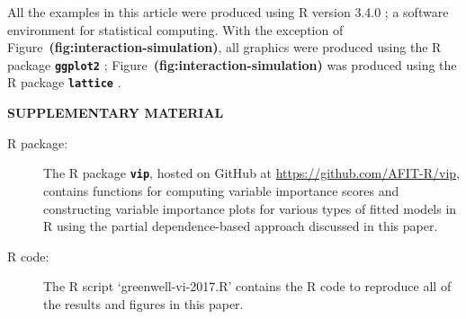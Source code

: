 \documentclass[12pt]{article}
\newcommand{\pkg}[1]{\texorpdfstring%
{{\normalfont\fontseries{b}\selectfont #1}}%
{#1}}
\newcommand{\file}[1]{{`\normalfont\textsf{#1}'}}
\def\pkg#1{\textbf{\texttt{#1}}}
\def\ref#1{\textbf{(#1)}}
\begin{document}
All the examples in this article were produced using R version 3.4.0 \citep{R}; a software environment for statistical computing. With the exception of Figure~\ref{fig:interaction-simulation}, all graphics were produced using the R package \pkg{ggplot2} \citep{pkg-ggplot2}; Figure~\ref{fig:interaction-simulation} was produced using the R package \pkg{lattice} \citep{pkg-lattice}.



\bigskip
\begin{center}
{\large\bf SUPPLEMENTARY MATERIAL}
\end{center}

\begin{description}

\item[R package:] The R package \pkg{vip}, hosted on GitHub at \url{https://github.com/AFIT-R/vip}, contains functions for computing variable importance scores and constructing variable importance plots for various types of fitted models in R using the partial dependence-based approach discussed in this paper.

\item[R code:] The R script \file{greenwell-vi-2017.R} contains the R code to reproduce all of the results and figures in this paper.

\end{description}






\end{document}
